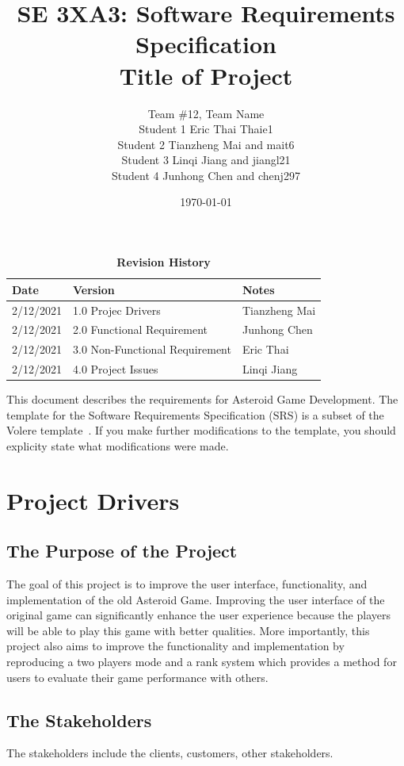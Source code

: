 \documentclass[12pt, titlepage]{article}
\title{SE 3XA3: Software Requirements Specification\\Title of Project}
\author{Team \#12, Team Name
		\\ Student 1 Eric Thai Thaie1
		\\ Student 2 Tianzheng Mai and mait6
		\\ Student 3 Linqi Jiang and jiangl21
		\\ Student 4 Junhong Chen and chenj297
}
\date{\today}
\begin{document}
\maketitle

\tableofcontents
\listoftables
\listoffigures

\begin{table}[bp]
\caption{\bf Revision History}
\begin{tabularx}{\textwidth}{p{3cm}p{2cm}X}
\toprule {\bf Date} & {\bf Version} & {\bf Notes}\\
\midrule
2/12/2021 & 1.0 Projec Drivers & Tianzheng Mai\\
2/12/2021 & 2.0 Functional Requirement & Junhong Chen\\
2/12/2021 & 3.0 Non-Functional Requirement & Eric Thai\\
2/12/2021 & 4.0 Project Issues & Linqi Jiang\\
\bottomrule
\end{tabularx}
\end{table}

\newpage


This document describes the requirements for Asteroid Game Development. The template for the Software Requirements Specification (SRS) is a subset of the Volere
template~\citep{RobertsonAndRobertson2012}.  If you make further modifications
to the template, you should explicity state what modifications were made.

\section{Project Drivers}

\subsection{The Purpose of the Project}
The goal of this project is to improve the user interface, functionality, and implementation of the old Asteroid Game. Improving the user interface of the original game can significantly enhance the user experience because the players will be able to play this game with better qualities. More importantly, this project also aims to improve the functionality and implementation by reproducing a two players mode and a rank system which provides a method for users to evaluate their game performance with others.
\subsection{The Stakeholders}
The stakeholders include the clients, customers, other stakeholders. 
\end{document}
